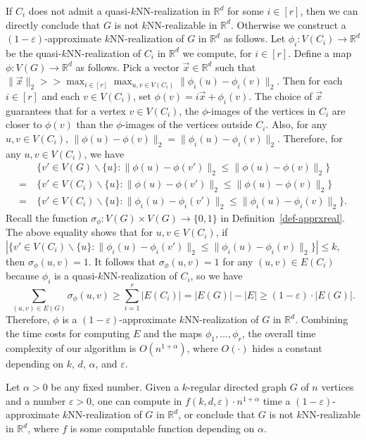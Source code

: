 \documentclass[english]{lipics-v2021}
\begin{document}
If $C_i$ does not admit a quasi-$k$NN-realization in $\mathbb{R}^d$ for some $i \in [r]$, then we can directly conclude that $G$ is not $k$NN-realizable in $\mathbb{R}^d$.
Otherwise we construct a $(1-\varepsilon)$-approximate $k$NN-realization of $G$ in $\mathbb{R}^d$ as follows.
Let $\phi_i:V(C_i) \rightarrow \mathbb{R}^d$ be the quasi-$k$NN-realization of $C_i$ in $\mathbb{R}^d$ we compute, for $i \in [r]$.
Define a map $\phi:V(G) \rightarrow \mathbb{R}^d$ as follows.
Pick a vector $\vec{x} \in \mathbb{R}^d$ such that $\lVert \vec{x} \rVert_2 >> \max_{i \in [r]} \max_{u,v \in V(C_i)} \lVert \phi_i(u) - \phi_i(v) \rVert_2$.
Then for each $i \in [r]$ and each $v \in V(C_i)$, set $\phi(v) = i \vec{x} + \phi_i(v)$.
The choice of $\vec{x}$ guarantees that for a vertex $v \in V(C_i)$, the $\phi$-images of the vertices in $C_i$ are closer to $\phi(v)$ than the $\phi$-images of the vertices outside $C_i$.
Also, for any $u,v \in V(C_i)$, $\lVert \phi(u) - \phi(v) \rVert_2 = \lVert \phi_i(u) - \phi_i(v) \rVert_2$.
Therefore, for any $u,v \in V(C_i)$, we have
\begin{align*}
    & \ \{v' \in V(G) \backslash \{u\}: \lVert \phi(u) - \phi(v') \rVert_2 \leq \lVert \phi(u) - \phi(v) \rVert_2\} \\
    = & \ \{v' \in V(C_i) \backslash \{u\}: \lVert \phi(u) - \phi(v') \rVert_2 \leq \lVert \phi(u) - \phi(v) \rVert_2\} \\
    = & \ \{v' \in V(C_i) \backslash \{u\}: \lVert \phi_i(u) - \phi_i(v') \rVert_2 \leq \lVert \phi_i(u) - \phi_i(v) \rVert_2\}.
\end{align*}
Recall the function $\sigma_\phi:V(G) \times V(G) \rightarrow \{0,1\}$ in Definition~\ref{def-apprxreal}.
The above equality shows that for $u,v \in V(C_i)$, if $|\{v' \in V(C_i) \backslash \{u\}: \lVert \phi_i(u) - \phi_i(v') \rVert_2 \leq \lVert \phi_i(u) - \phi_i(v) \rVert_2\}| \leq k$, then $\sigma_\phi(u,v) = 1$.
It follows that $\sigma_\phi(u,v) = 1$ for any $(u,v) \in E(C_i)$ because $\phi_i$ is a quasi-$k$NN-realization of $C_i$,
so we have
\begin{equation*}
    \sum_{(u,v) \in E(G)} \sigma_\phi(u,v) \geq \sum_{i=1}^r |E(C_i)| = |E(G)| - |E| \geq (1-\varepsilon) \cdot |E(G)|.
\end{equation*}
Therefore, $\phi$ is a $(1-\varepsilon)$-approximate $k$NN-realization of $G$ in $\mathbb{R}^d$.
Combining the time costs for computing $E$ and the maps $\phi_1,\dots,\phi_r$, the overall time complexity of our algorithm is $O(n^{1+\alpha})$, where $O(\cdot)$ hides a constant depending on $k$, $d$, $\alpha$, and $\varepsilon$.
\begin{theorem}
Let $\alpha > 0$ be any fixed number.
Given a $k$-regular directed graph $G$ of $n$ vertices and a number $\varepsilon > 0$, one can compute in $f(k,d,\varepsilon) \cdot n^{1+\alpha}$ time a $(1-\varepsilon)$-approximate $k$NN-realization of $G$ in $\mathbb{R}^d$, or conclude that $G$ is not $k$NN-realizable in $\mathbb{R}^d$, where $f$ is some computable function depending on $\alpha$.
\end{theorem}
\end{document}
